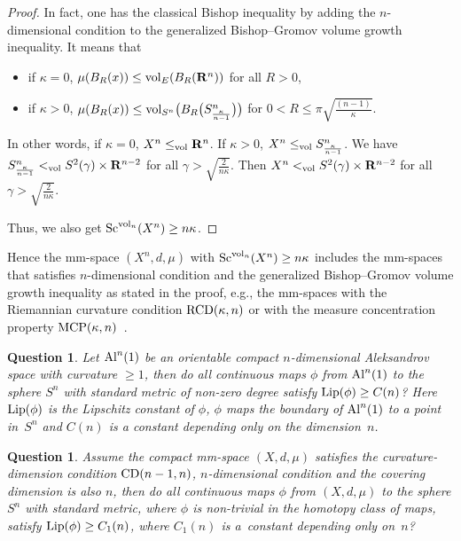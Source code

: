 \documentclass[10pt,a4paper]{amsart}
\newtheorem{Question}[Theorem]{Question}
\begin{document}
\begin{proof}
In fact, one has the classical Bishop inequality by adding the $n$-dimensional condition to the generalized Bishop--Gromov volume growth inequality. It means that
\begin{itemize}\itemsep=0pt
\item if $\kappa=0$, $\mu(B_R(x))\leq {\rm vol}_E(B_R(\mathbf{R}^n))$ for all $R>0$,
\item if $\kappa>0$, $\mu(B_R(x))\leq {\rm vol}_{S^n}\big(B_R\big(S^n_{\frac{\kappa}{n-1}}\big)\big)$ for $0< R\leq \pi \sqrt{\frac{(n-1)}{\kappa}}$.
\end{itemize}
In other words, if $\kappa=0$, $X^n\leq_{\rm vol}\mathbf{R}^n$. If $\kappa>0$, $X^n\leq_{\rm vol}S^n_{\frac{\kappa}{n-1}}$. We have $S^n_{\frac{\kappa}{n-1}}<_{\rm vol} S^2(\gamma)\times \mathbf{R}^{n-2}$ for all $\gamma>\sqrt{\frac{2}{n\kappa}}$. Then $X^n<_{\rm vol} S^2(\gamma)\times \mathbf{R}^{n-2}$ for all $\gamma>\sqrt{\frac{2}{n\kappa}}$.

 Thus, we also get ${\rm Sc}^{{\rm vol}_n}(X^n)\geq n\kappa$.
\end{proof}


\begin{Remark}
Hence the mm-space $(X^n, d, \mu)$ with ${\rm Sc}^{{\rm vol}_n}(X^n)\geq n\kappa$ includes the mm-spaces that satisfies $n$-dimensional condition and the generalized Bishop--Gromov volume growth inequality as stated in the proof, e.g., the mm-spaces with the Riemannian curvature condition ${\rm RCD}(\kappa,n)$ \cite{MR3205729} or with the measure concentration property ${\rm MCP}(\kappa,n)$~\cite{MR2341840}.
\end{Remark}

\begin{Question}Let ${\rm Al}^n(1)$ be an orientable compact $n$-dimensional Aleksandrov space with curvature $\geq 1$, then do all continuous maps $\phi$ from ${\rm Al}^n(1)$ to the sphere $S^n$ with standard metric of non-zero degree satisfy ${\rm Lip}(\phi)\geq C(n)$? Here ${\rm Lip}(\phi)$ is the Lipschitz constant of $\phi$, $\phi$ maps the boundary of ${\rm Al}^n(1)$ to a point in~$S^n$ and $C(n)$ is a constant depending only on the dimension~$n$.
\end{Question}

\begin{Question}Assume the compact mm-space $(X, d, \mu)$ satisfies the curvature-dimension condition ${\rm CD}(n-1, n)$, $n$-dimensional condition and the covering dimension is also $n$, then do all continuous maps $\phi$ from $(X, d, \mu)$ to the sphere $S^n$ with standard metric, where $\phi$ is non-trivial in the homotopy class of maps, satisfy ${\rm Lip}(\phi)\geq C_1(n)$, where $C_1(n)$ is a~constant depending only on~$n$?
\end{Question}
\end{document}
